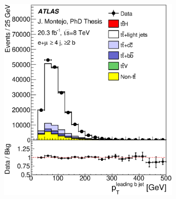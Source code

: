 \begin{figure}[tp!]
\begin{subfigure}{0.32\textwidth}
  \caption{} \end{subfigure}
  \\
  \begin{subfigure}{0.32\textwidth}
  \includegraphics[width=\textwidth]{Modeling/Figures/plots_4j2b/bjet1_pt_ELEMUON_4jetin2btagin_NOMINAL.eps}             
  \caption{} \end{subfigure}
  \begin{subfigure}{0.32\textwidth}

\end{subfigure}
\end{figure}
